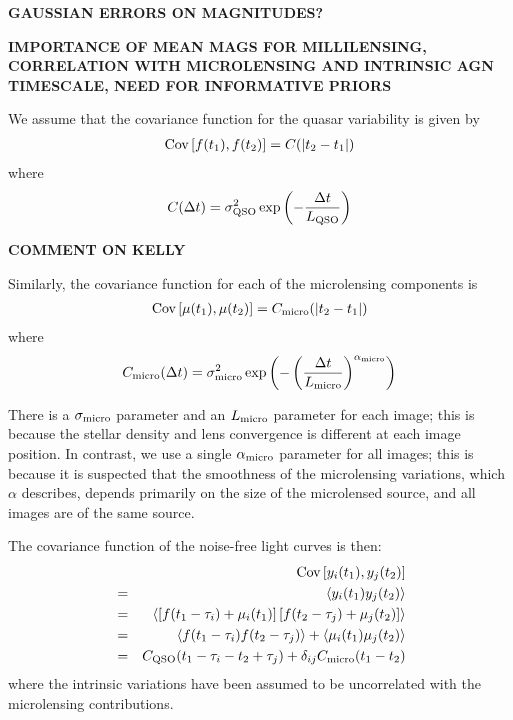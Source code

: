 \documentclass[useAMS,usenatbib, a4paper]{mn2e} \usepackage{natbib}
\begin{document}
{\bf GAUSSIAN ERRORS ON MAGNITUDES?}

{\bf IMPORTANCE OF MEAN MAGS FOR MILLILENSING, CORRELATION WITH MICROLENSING AND INTRINSIC AGN TIMESCALE, NEED FOR INFORMATIVE PRIORS}

We assume that the covariance function for the quasar variability is given by
\begin{eqnarray}
\textnormal{Cov}\left[f(t_1), f(t_2)\right] = C(|t_2 - t_1|)
\end{eqnarray}
where
\begin{eqnarray}
C(\Delta t) = \sigma_{\rm QSO}^2\exp\left(-\frac{\Delta t}{L_{\rm QSO}}\right)
\end{eqnarray}

{\bf COMMENT ON KELLY}

Similarly, the covariance function for each of the microlensing components is
\begin{eqnarray}
\textnormal{Cov}\left[\mu(t_1), \mu(t_2)\right] = C_{\rm micro}(|t_2 - t_1|)
\end{eqnarray}
where
\begin{eqnarray}
C_{\rm micro}(\Delta t) = \sigma_{\rm micro}^2\exp\left(-\left(\frac{\Delta t}{L_{\rm micro}}\right)^{\alpha_{\rm micro}}\right)
\end{eqnarray}

There is a $\sigma_{\rm micro}$  parameter and an $L_{\rm micro}$ parameter
for each image; this is because the stellar density and lens convergence is
different at each image position. In contrast, we use a single $\alpha_{\rm
micro}$ parameter for all images; this is because it is suspected that the
smoothness of the microlensing variations, which $\alpha$ describes, depends
primarily on the size of the microlensed source, and all images are of the
same source. 

The covariance function of the noise-free light curves is then:
\begin{eqnarray}
& & \textnormal{Cov}\left[y_i(t_1), y_j(t_2)\right] \nonumber\\
&=& \left<y_i(t_1)y_j(t_2)\right> \\
&=& \left<\left[f(t_1 - \tau_i) + \mu_i(t_1)\right]\left[f(t_2 - \tau_j) + \mu_j(t_2)\right]\right> \\
&=& \left<f(t_1 - \tau_i)f(t_2 - \tau_j)\right> + \left<\mu_i(t_1)\mu_j(t_2)\right> \\
&=& C_{\rm QSO}(t_1 - \tau_i - t_2 + \tau_j) + \delta_{ij}C_{\rm micro}(t_1 - t_2)
\end{eqnarray}
where the intrinsic variations have been assumed to be uncorrelated with the
microlensing contributions.
\end{document}
